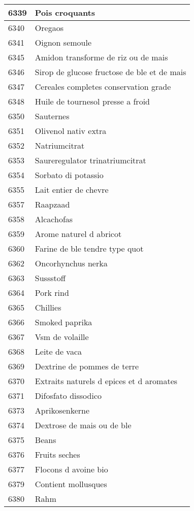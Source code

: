 \begin{longtable}{|l|l|}
6339 & Pois croquants \\ \hline 
6340 & Oregaos \\ \hline 
6341 & Oignon semoule \\ \hline 
6345 & Amidon transforme de riz ou de mais \\ \hline 
6346 & Sirop de glucose fructose de ble et de mais \\ \hline 
6347 & Cereales completes conservation grade \\ \hline 
6348 & Huile de tournesol presse a froid \\ \hline 
6350 & Sauternes \\ \hline 
6351 & Olivenol nativ extra \\ \hline 
6352 & Natriumcitrat \\ \hline 
6353 & Saureregulator trinatriumcitrat \\ \hline 
6354 & Sorbato di potassio \\ \hline 
6355 & Lait entier de chevre \\ \hline 
6357 & Raapzaad \\ \hline 
6358 & Alcachofas \\ \hline 
6359 & Arome naturel d abricot \\ \hline 
6360 & Farine de ble tendre type quot \\ \hline 
6362 & Oncorhynchus nerka \\ \hline 
6363 & Sussstoff \\ \hline 
6364 & Pork rind \\ \hline 
6365 & Chillies \\ \hline 
6366 & Smoked paprika \\ \hline 
6367 & Vsm de volaille \\ \hline 
6368 & Leite de vaca \\ \hline 
6369 & Dextrine de pommes de terre \\ \hline 
6370 & Extraits naturels d epices et d aromates \\ \hline 
6371 & Difosfato dissodico \\ \hline 
6373 & Aprikosenkerne \\ \hline 
6374 & Dextrose de mais ou de ble \\ \hline 
6375 & Beans \\ \hline 
6376 & Fruits seches \\ \hline 
6377 & Flocons d avoine bio \\ \hline 
6379 & Contient mollusques \\ \hline 
6380 & Rahm \\ \hline 

\end{longtable}
